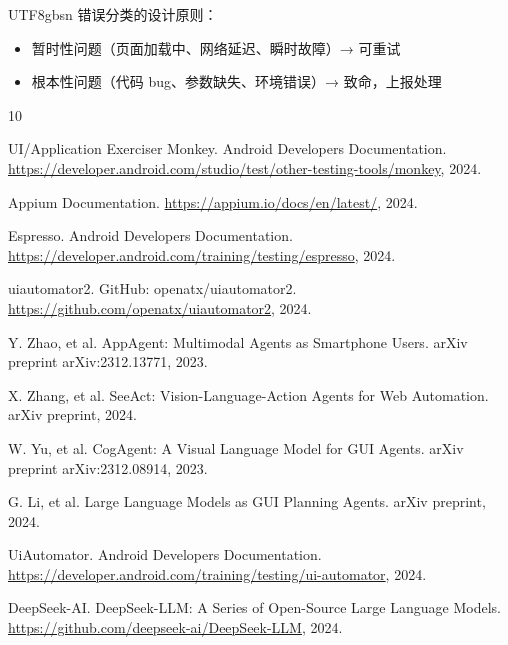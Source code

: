 \documentclass{article}
\begin{document}
\begin{CJK}{UTF8}{gbsn}
错误分类的设计原则：
\begin{itemize}
  \item 暂时性问题（页面加载中、网络延迟、瞬时故障）→ 可重试
  \item 根本性问题（代码 bug、参数缺失、环境错误）→ 致命，上报处理
\end{itemize}


\begin{thebibliography}{10}

UI/Application Exerciser Monkey.
\newblock Android Developers Documentation.
\newblock \url{https://developer.android.com/studio/test/other-testing-tools/monkey}, 2024.

Appium Documentation.
\newblock \url{https://appium.io/docs/en/latest/}, 2024.

Espresso.
\newblock Android Developers Documentation.
\newblock \url{https://developer.android.com/training/testing/espresso}, 2024.

uiautomator2.
\newblock GitHub: openatx/uiautomator2.
\newblock \url{https://github.com/openatx/uiautomator2}, 2024.

Y. Zhao, et al.
\newblock AppAgent: Multimodal Agents as Smartphone Users.
\newblock arXiv preprint arXiv:2312.13771, 2023.

X. Zhang, et al.
\newblock SeeAct: Vision-Language-Action Agents for Web Automation.
\newblock arXiv preprint, 2024.

W. Yu, et al.
\newblock CogAgent: A Visual Language Model for GUI Agents.
\newblock arXiv preprint arXiv:2312.08914, 2023.

G. Li, et al.
\newblock Large Language Models as GUI Planning Agents.
\newblock arXiv preprint, 2024.

UiAutomator.
\newblock Android Developers Documentation.
\newblock \url{https://developer.android.com/training/testing/ui-automator}, 2024.

DeepSeek-AI.
\newblock DeepSeek-LLM: A Series of Open-Source Large Language Models.
\newblock \url{https://github.com/deepseek-ai/DeepSeek-LLM}, 2024.

\end{thebibliography}

\end{CJK}
\end{document}
